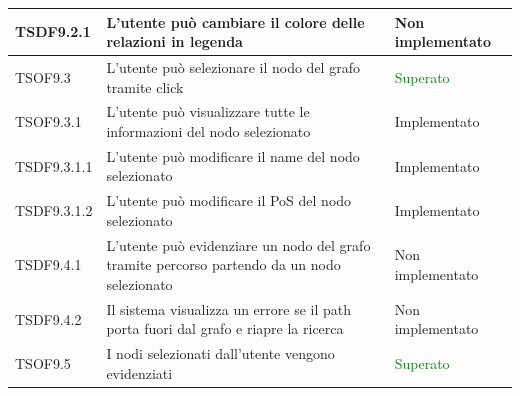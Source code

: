 \documentclass[openany,12pt,a4paper]{report}
\begin{document}
\begin{longtable}{| p{2cm} |p{8cm} | p{2.5cm} |}
	\newline TSDF9.2.1&
	\newline L'utente può cambiare il colore delle relazioni in legenda&
	\newline  Non implementato
	\\[1em]
	\hline
	
	\newline TSOF9.3&
	\newline L'utente può selezionare il nodo del grafo tramite click&
	\newline \textcolor{green}{Superato}
	\\[1em]
	\hline
	
	\newline TSOF9.3.1&
	\newline L'utente può visualizzare tutte le informazioni del nodo selezionato&
	\newline Implementato
	\\[1em]
	\hline
	
	\newline TSDF9.3.1.1&
	\newline L'utente può modificare il name del nodo selezionato&
	\newline Implementato
	\\[1em]
	\hline
	
	\newline TSDF9.3.1.2&
	\newline L'utente può modificare il PoS del nodo selezionato&
	\newline Implementato
	\\[1em]
	\hline
	
	\newline TSDF9.4.1&
	\newline L'utente può evidenziare un nodo del grafo tramite percorso partendo da un nodo selezionato&
	\newline Non implementato
	\\[1em]
	\hline
	
	\newline TSDF9.4.2&
	\newline Il sistema visualizza un errore se il path porta fuori dal grafo e riapre la ricerca&
	\newline Non implementato
	\\[1em]
	\hline
	
	\newline TSOF9.5&
	\newline I nodi selezionati dall'utente vengono evidenziati&
	\newline \textcolor{green}{Superato}
	\\[1em]
	\hline
	

\end{longtable}
\end{document}
